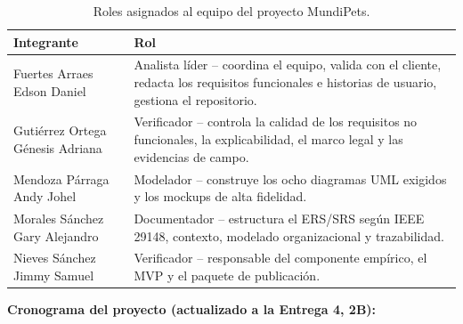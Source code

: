 \documentclass[journal,onecolumn]{IEEEtran}
\begin{document}
	\begin{table}[H]
		\caption{Roles asignados al equipo del proyecto MundiPets.}
		\centering
		\begin{tabularx}{\linewidth}{|X|X|}
			\hline
			\textbf{Integrante} & \textbf{Rol} \\
			\hline
			Fuertes Arraes Edson Daniel & Analista líder -- coordina el equipo, valida con el cliente, redacta los requisitos funcionales e historias de usuario, gestiona el repositorio. \\
			\hline
			Gutiérrez Ortega Génesis Adriana & Verificador -- controla la calidad de los requisitos no funcionales, la explicabilidad, el marco legal y las evidencias de campo. \\
			\hline
			Mendoza Párraga Andy Johel & Modelador -- construye los ocho diagramas UML exigidos y los mockups de alta fidelidad. \\
			\hline
			Morales Sánchez Gary Alejandro & Documentador -- estructura el ERS/SRS según IEEE 29148, contexto, modelado organizacional y trazabilidad. \\
			\hline
			Nieves Sánchez Jimmy Samuel & Verificador -- responsable del componente empírico, el MVP y el paquete de publicación. \\
			\hline
		\end{tabularx}
	\end{table}
	
	\textbf{Cronograma del proyecto (actualizado a la Entrega 4, 2B):}
	
\end{document}
